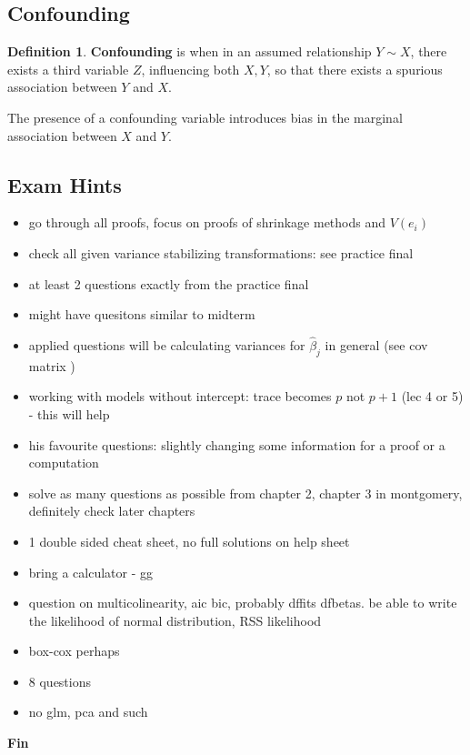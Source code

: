 \documentclass[12pt, a4paper]{article}
\theoremstyle{definition}
\newtheorem{definition}{Definition}
\begin{document}
	\subsection{Confounding}
	
	\begin{definition}
		{\bf Confounding} is when in an assumed relationship $Y \sim X$, there exists a third variable $Z$, influencing both $X,Y$, so that there exists a spurious association between $Y$ and $X$.
	\end{definition}
	
	The presence of a confounding variable introduces bias in the marginal association between $X$ and $Y$.
	
	\subsection{Exam Hints}
	
	\begin{itemize}
		\item go through all proofs, focus on proofs of shrinkage methods and $V(e_i)$
		\item check all given variance stabilizing transformations: see practice final
		\item at least 2 questions exactly from the practice final
		\item might have quesitons similar to midterm
		\item applied questions will be calculating variances for $\hat \beta_j$ in general (see cov matrix )
		\item working with models without intercept: trace becomes $p$ not $p+1$ (lec 4 or 5) - this will help
		\item his favourite questions: slightly changing some information for a proof or a computation
		\item solve as many questions as possible from chapter 2, chapter 3 in montgomery, definitely check later chapters
		\item 1 double sided cheat sheet, no full solutions on help sheet
		\item bring a calculator - gg
		\item question on multicolinearity, aic bic, probably dffits dfbetas. be able to write the likelihood of normal distribution, RSS likelihood
		\item box-cox perhaps
		\item 8 questions
		\item no glm, pca and such
	\end{itemize}
	\vspace{100pt}
	\begin{center}
		{\bf Fin}
	\end{center}
	
	
	

	
		
		
		
			
	
		
		
\end{document}
